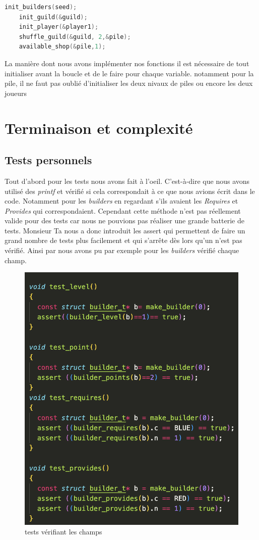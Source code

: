 \documentclass{article}
\begin{document}
\begin{tcolorbox}[colback=gray!10,colframe=white!75!black]
\label{boucle}
\begin{lstlisting}[language=C, caption={La fonction \text{Boucle de jeu}},label={lst:exemple14-c}]
init_builders(seed);
    init_guild(&guild);
    init_player(&player1);
    shuffle_guild(&guild, 2,&pile);
    available_shop(&pile,1);
\end{lstlisting}
\end{tcolorbox}

La manière dont nous avons implémenter nos fonctions il est nécessaire de tout initialiser avant la boucle et de le faire pour chaque variable. notamment pour la pile, il ne faut pas oublié d'initialiser les deux nivaux de piles ou encore les deux joueurs



\newpage
\section{Terminaison et complexité}

\subsection{Tests personnels}

\vspace{1em}   Tout d'abord pour les tests nous avons fait à l'oeil. C'est-à-dire que nous avons utilisé des \emph{printf} et vérifié si cela correspondait à ce que nous avions écrit dans le code. Notamment pour les \emph{builders} en regardant s'ils avaient les \emph{Requires} et \emph{Provides} qui correspondaient. Cependant cette méthode n'est pas réellement valide pour des tests car nous ne pouvions pas réaliser une grande batterie de tests. Monsieur Ta nous a donc introduit les assert qui permettent de faire un grand nombre de tests plus facilement et qui s'arrête dès lors qu'un n'est pas vérifié. Ainsi par nous avons pu par exemple pour les \emph{builders} vérifié chaque champ. 

\begin{figure}[ht]
    \centering
    \includegraphics[width=0.3\linewidth]{test builders.png}
    \caption{tests vérifiant les champs}
    \label{fig:testbuilder}
\end{figure}
\end{document}
